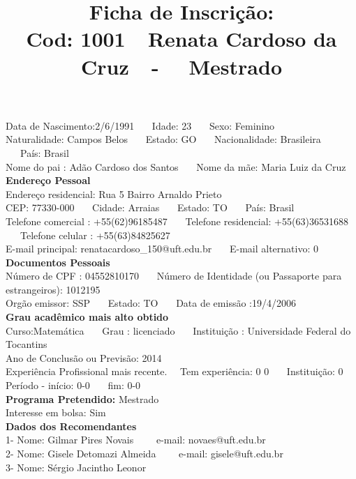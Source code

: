 \documentclass[11pt]{article}
\title{\vspace*{-4cm} Ficha de Inscrição: \\Cod: 1001\ \ Renata Cardoso da Cruz\ \ - \ \ Mestrado 
 }
\date{}
\begin{document}
\maketitle
\vspace*{-1.5cm}
\noindent Data de Nascimento:2/6/1991
\ \ \ Idade: 23   \ \ \ Sexo: Feminino
\\
Naturalidade: Campos Belos  
\ \ \  Estado: GO
\ \ \  Nacionalidade: Brasileira
\ \ \ País: Brasil 
\\        
Nome do pai : Adão Cardoso dos Santos
\ \ \ Nome da mãe: Maria Luiz da Cruz          
\\[0.2cm]                     
\textbf{Endereço Pessoal} 
\\ 
\noindent Endereço residencial: Rua 5 Bairro Arnaldo Prieto
\\
        CEP: 77330-000 
\ \ \ Cidade: Arraias 
\ \ \ Estado: TO 
\ \ \ País: Brasil
\\		
		Telefone comercial : +55(62)96185487
\ \ \ Telefone residencial: +55(63)36531688
\ \ \ Telefone celular : +55(63)84825627
\\
E-mail principal: renatacardoso\_150@uft.edu.br
\ \ \ E-mail alternativo: 0 
\\[0.2cm] 
\textbf{Documentos Pessoais}
\\
\noindent Número de CPF : 04552810170
\ \ \ Número de Identidade (ou Passaporte para estrangeiros): 1012195
\\
Orgão emissor: SSP
\ \ \ Estado: TO
\ \ \ Data de emissão :19/4/2006
\\[0.3cm]
\textbf{Grau acadêmico mais alto obtido}
\\	
Curso:Matemática
\ \ \ Grau : licenciado
\ \ \ Instituição : Universidade Federal do Tocantins
\\			
Ano de Conclusão ou Previsão: 2014
\\ 
Experiência Profissional mais recente. \ \  
Tem experiência: 0 0  
\ \ \ Instituição: 0
\\  
Período - início: 0-0
\ \ \ fim: 0-0
\\[0.2cm] 
\textbf{Programa Pretendido:} Mestrado\\
Interesse em bolsa: Sim
\\[0.3cm]		
\textbf{Dados dos Recomendantes} 
\\
1- Nome: Gilmar Pires Novais
\ \ \ \  e-mail: novaes@uft.edu.br 
\\
2- Nome: Gisele Detomazi Almeida
\ \ \ \ e-mail: gisele@uft.edu.br
\\
3- Nome: Sérgio Jacintho Leonor
\end{document}
